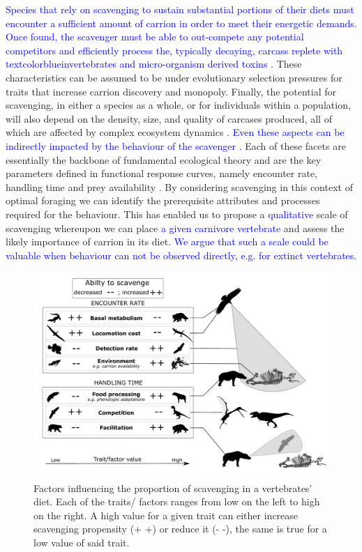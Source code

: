 \documentclass[a4paper,12pt]{article}
\begin{document}
\textcolor{blue}{Species that rely on scavenging to sustain substantial portions of their diets must encounter a sufficient amount of carrion in order to meet their energetic demands.
Once found, the scavenger must be able to out-compete any potential competitors and efficiently process the, typically decaying, carcass replete with textcolor{blue}{invertebrates} and micro-organism derived toxins \citep{ruxton2014fruit}.}
These characteristics can be assumed to be under evolutionary selection pressures for traits that increase carrion discovery and monopoly.
Finally, the potential for scavenging, in either a species as a whole, or for individuals within a population, will also depend on the density, size, and quality of carcases produced, all of which are affected by complex ecosystem dynamics \textcolor{blue}{\citep{moleon2014inter}. 
Even these aspects can be indirectly impacted by the behaviour of the scavenger \citep{moleon2014inter}.}
Each of these facets are essentially the backbone of fundamental ecological theory and are the key parameters defined in functional response curves, namely encounter rate, handling time and prey availability \citep{jeschke2002predator}.  
By considering scavenging in this context of optimal foraging we can identify the prerequisite attributes and processes required for the behaviour. 
This has enabled us to propose a \textcolor{blue}{qualitative} scale of scavenging whereupon we can place \textcolor{blue}{a given carnivore vertebrate} and assess the likely importance of carrion in its diet.
\textcolor{blue}{We argue that such a scale could be valuable when behaviour can not be observed directly, e.g. for extinct vertebrates.}

\begin{figure}[!htbp]
\centering
   \includegraphics[width=1\textwidth]{CompositeFigure/Compositefig4.pdf}
\caption{Factors influencing the proportion of scavenging in a vertebrates' diet. Each of the traits/ factors ranges from low on the left to high on the right. A high value for a given trait can either increase scavenging propensity (+ +) or reduce it (- -), the same is true for a low value of said trait.}
\label{Summary_figure}
\end{figure}
\end{document}
